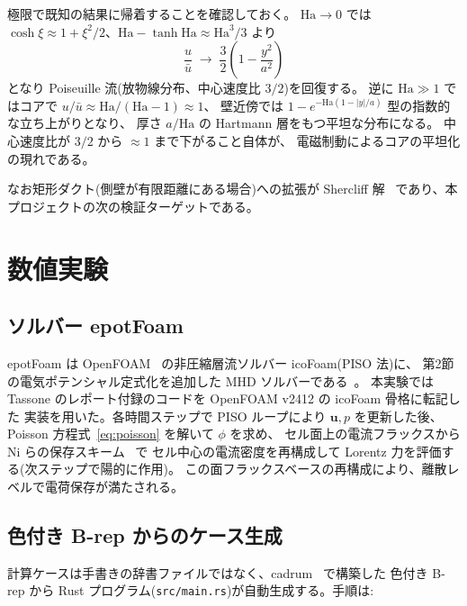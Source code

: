 \documentclass{ltjsarticle}   %
\newcommand{\Ha}{\mathrm{Ha}}
\begin{document}
極限で既知の結果に帰着することを確認しておく。
$\Ha\to 0$ では $\cosh\xi \approx 1+\xi^2/2$、$\Ha-\tanh\Ha \approx \Ha^3/3$ より
\begin{equation}
  \frac{u}{\bar{u}} \;\longrightarrow\; \frac{3}{2}\left(1-\frac{y^2}{a^2}\right)
\end{equation}
となり Poiseuille 流(放物線分布、中心速度比 $3/2$)を回復する。
逆に $\Ha\gg 1$ ではコアで $u/\bar{u} \approx \Ha/(\Ha-1) \approx 1$、
壁近傍では $1-e^{-\Ha(1-|y|/a)}$ 型の指数的な立ち上がりとなり、
厚さ $a/\Ha$ の Hartmann 層をもつ平坦な分布になる。
中心速度比が $3/2$ から $\approx 1$ まで下がること自体が、
電磁制動によるコアの平坦化の現れである。

なお矩形ダクト(側壁が有限距離にある場合)への拡張が Shercliff 解~\cite{shercliff1953}
であり、本プロジェクトの次の検証ターゲットである。

\section{数値実験}
\label{sec:numerical}

\subsection{ソルバー epotFoam}

epotFoam は OpenFOAM~\cite{weller1998} の非圧縮層流ソルバー icoFoam(PISO 法)に、
第2節の電気ポテンシャル定式化を追加した MHD ソルバーである~\cite{tassone2016}。
本実験では Tassone のレポート付録のコードを OpenFOAM v2412 の icoFoam 骨格に転記した
実装を用いた。各時間ステップで PISO ループにより $\boldsymbol{u},p$ を更新した後、
Poisson 方程式~\eqref{eq:poisson} を解いて $\phi$ を求め、
セル面上の電流フラックスから Ni らの保存スキーム~\cite{ni2007} で
セル中心の電流密度を再構成して Lorentz 力を評価する(次ステップで陽的に作用)。
この面フラックスベースの再構成により、離散レベルで電荷保存が満たされる。

\subsection{色付き B-rep からのケース生成}
\label{sec:casegen}

計算ケースは手書きの辞書ファイルではなく、cadrum~\cite{cadrum} で構築した
色付き B-rep から Rust プログラム(\texttt{src/main.rs})が自動生成する。手順は:
\end{document}
